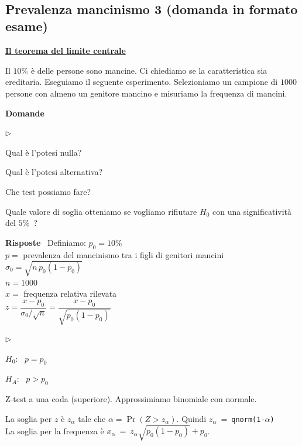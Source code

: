 \documentclass[12pt,openany]{book}
\newcommand{\mylabel}[1]{{\footnotesize\textsf{#1}}\hfill}
\renewenvironment{itemize}
  {\begin{list}{$\triangleright$}{%
   \setlength{\parskip}{0mm}
   \setlength{\topsep}{.2\baselineskip}
   \setlength{\rightmargin}{0mm}
   \setlength{\listparindent}{0mm}
   \setlength{\itemindent}{0mm}
   \setlength{\labelwidth}{3ex}
   \setlength{\itemsep}{.4\baselineskip}
   \setlength{\parsep}{0mm}
   \setlength{\partopsep}{0mm}
   \setlength{\labelsep}{1ex}
   \setlength{\leftmargin}{\labelwidth+\labelsep}
   \let\makelabel\mylabel}}{%
   \end{list}\vspace*{-1.3mm}}
\theoremstyle{mio}
\theoremstyle{liscio}
\begin{document}
\hfill{}\clearpage\
\subsection{Prevalenza mancinismo 3 (domanda in formato esame)}
\label{mancini3}
\hfill\textbf{{\color{brown}\hyperref[CLT]{Il teorema del limite centrale \faShare}}}

Il $10\%$ è delle persone sono mancine. Ci chiediamo se la caratteristica sia ereditaria. Eseguiamo il seguente esperimento. Selezioniamo un campione di $1000$ persone con almeno un genitore mancino e misuriamo la frequenza di mancini.

\textbf{Domande}

\begin{itemize}
\item[1.] Qual è l'potesi nulla?

\item[2.] Qual è l'potesi alternativa?

\item[3.] Che test possiamo fare?

\item[4.] Quale valore di soglia otteniamo se vogliamo rifiutare $H_0$ con una significatività del $5\%$~?
\end{itemize}

\textbf{Risposte} \ Definiamo: 
$p_0=10\%$\\
$p=$  prevalenza del mancinismo tra i figli di genitori mancini\\
$\sigma_0=\sqrt{n\, p_0(1-p_0)}$\\
$n=1000$\\
$x = $ frequenza relativa rilevata\\
$z=\dfrac{x - p_0}{\sigma_0/\sqrt{n}}=\dfrac{x - p_0}{\sqrt{p_0(1-p_0)}}$\\

\begin{itemize}
\item[1.] $H_0$: \ $p=p_0$ 
\item[2.] $H_A$: \ $p>p_0$ 
\item[3.] Z-test a una coda (superiore). Approssimiamo binomiale con normale.
\item[4.] La soglia per $z$ è $z_\alpha$ tale che $\alpha=\Pr(Z>z_\alpha)$. Quindi $z_\alpha\ =\ ${\tt qnorm(1-$\alpha$)}\\
La soglia per la frequenza è $x_\alpha\ =\ z_\alpha\sqrt{p_0(1-p_0)} +p_0$.
\end{itemize}
\end{document}
